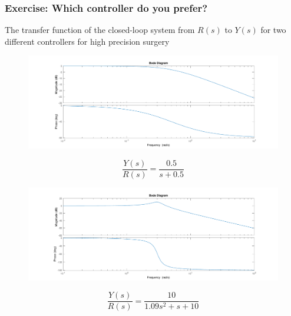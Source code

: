 \begin{frame}
	\frametitle{Exercise: Which controller do you prefer?}
	The transfer function of the closed-loop system from $R(s)$ to $Y(s)$ for two different controllers for high precision surgery\\
	\hspace*{-2em}
	\begin{minipage}{0.7\linewidth}
	\begin{figure}
\centering
\includegraphics[width=\columnwidth]{smooth-bode}
\label{fig:smooth-bode}
\end{figure}
\end{minipage}
\begin{minipage}{0.2\linewidth}
	\[\frac{Y(s)}{R(s)} = \frac{0.5}{s+0.5}\]
\end{minipage}

\hspace*{-2em}
\begin{minipage}{0.7\linewidth}
\begin{figure}
\centering
\includegraphics[width=\columnwidth]{osc-bode}
\label{fig:osc-bode}
\end{figure}
\end{minipage}
\begin{minipage}{0.2\linewidth}
	\[\frac{Y(s)}{R(s)} = \frac{10}{1.09s^2 + s + 10}\]
\end{minipage}
\end{frame}



